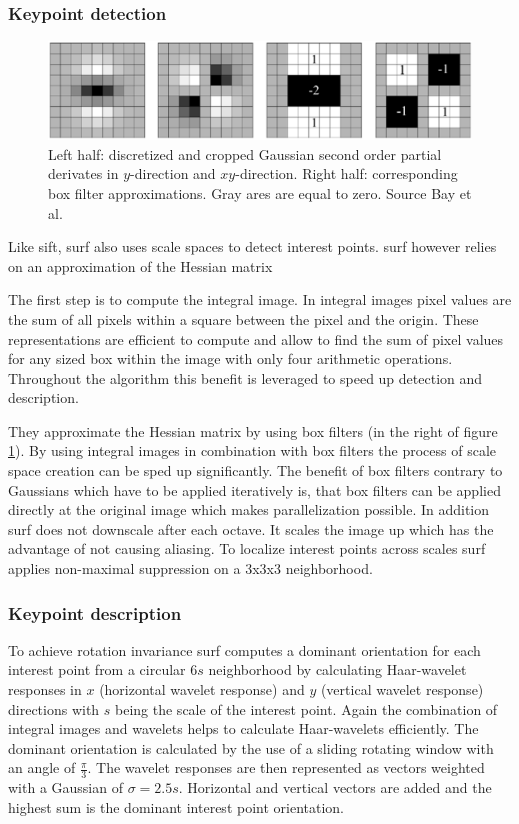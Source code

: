 \subsubsection*{Keypoint detection}
\begin{figure}[ht]
	\centering
	\includegraphics[scale=0.2]{figures/theorySURF_boxFilters}
	\caption{Left half: discretized and cropped Gaussian second order partial derivates in $y$-direction and $xy$-direction. Right half: corresponding box filter approximations. Gray ares are equal to zero. Source Bay et al. \cite{Bay2008}}
	\label{fig:surfBoxFilters}
\end{figure}
Like \gls{sift}, \gls{surf} also uses scale spaces to detect interest points. \gls{surf} however relies on an approximation of the Hessian matrix

The first step is to compute the integral image. In integral images pixel values are the sum of all pixels within a square between the pixel and the origin. These representations are efficient to compute and allow to find the sum of pixel values for any sized box within the image with only four arithmetic operations. Throughout the algorithm this benefit is leveraged to speed up detection and description.

They approximate the Hessian matrix by using box filters {(in the right of figure \ref{fig:surfBoxFilters})}. By using integral images in combination with box filters the process of scale space creation can be sped up significantly. The benefit of box filters contrary to Gaussians which have to be applied iteratively is, that box filters can be applied directly at the original image which makes parallelization possible. In addition \gls{surf} does not downscale after each octave. It scales the image up which has the advantage of not causing aliasing. To localize interest points across scales \gls{surf} applies non-maximal suppression on a 3x3x3 neighborhood. 

\subsubsection*{Keypoint description}
To achieve rotation invariance \gls{surf} computes a dominant orientation for each interest point from a circular 6$s$ neighborhood by calculating Haar-wavelet responses in $x$ {(horizontal wavelet response)} and $y$ {(vertical wavelet response)} directions with $s$ being the scale of the interest point. Again the combination of integral images and wavelets helps to calculate Haar-wavelets efficiently. The dominant orientation is calculated by the use of a sliding rotating window with an angle of $\frac{\pi}{3}$. The wavelet responses are then represented as vectors weighted with a Gaussian of $\sigma=2.5s$. Horizontal and vertical vectors are added and the highest sum is the dominant interest point orientation.

